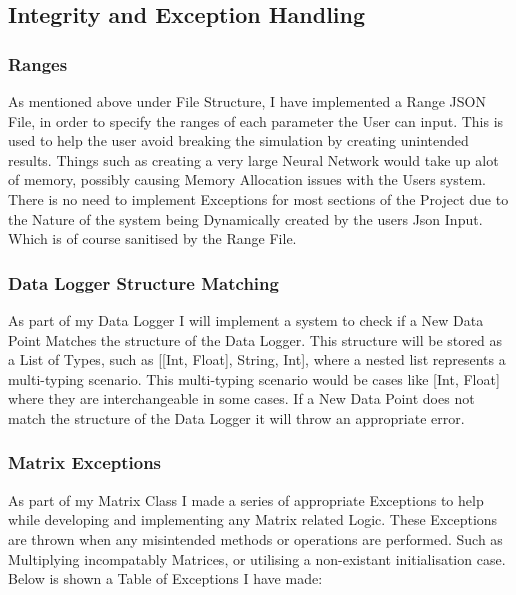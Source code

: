 \begin{flushleft}
        \subsection{Integrity and Exception Handling}
            \subsubsection{Ranges}
                As mentioned above under File Structure, I have implemented a Range JSON File, in order to specify the ranges of each parameter the User can
                input. This is used to help the user avoid breaking the simulation by creating unintended results. Things such as creating a very large Neural
                Network would take up alot of memory, possibly causing Memory Allocation issues with the Users system. There is no need to implement Exceptions 
                for most sections of the Project due to the Nature of the system being Dynamically created by the users Json Input. Which is of course sanitised 
                by the Range File.
            \subsubsection{Data Logger Structure Matching}   
                As part of my Data Logger I will implement a system to check if a New Data Point Matches the structure of the Data Logger. This structure will
                be stored as a List of Types, such as [[Int, Float], String, Int], where a nested list represents a multi-typing scenario. This multi-typing 
                scenario would be cases like [Int, Float] where they are interchangeable in some cases. If a New Data Point does not match the structure of
                the Data Logger it will throw an appropriate error.
            \subsubsection{Matrix Exceptions}    
                As part of my Matrix Class I made a series of appropriate Exceptions to help while developing and implementing any Matrix related Logic. These
                Exceptions are thrown when any misintended methods or operations are performed. Such as Multiplying incompatably Matrices, or utilising a non-existant
                initialisation case. Below is shown a Table of Exceptions I have made:


\end{flushleft}
